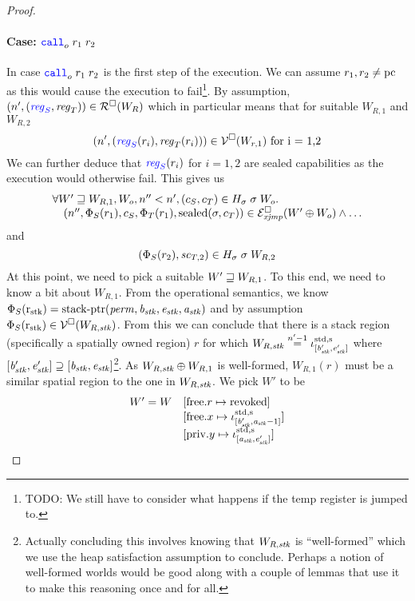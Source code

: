 \documentclass[a4paper]{article}
\begin{document}
\begin{proof}
\paragraph{Case: $\scall[o]{}{r_1}{r_2}$}
In case $\scall[o]{}{r_1}{r_2}$ is the first step of the execution. We can assume $r_1,r_2 \neq \pcreg$ as this would cause the execution to fail\footnote{{\color{red} TODO:} We still have to consider what happens if the temp register is jumped to.}. By assumption, $\npair[n']{\stpair{\reg}{\reg}} \in \lrr(W_R)$ which in particular means that for suitable $W_{R,1}$ and $W_{R,2}$
\[
  \npair[n']{(\src{\reg_S}(r_i),\reg_T(r_i))} \in \lrv(W_{r,1}) \text{ for i = 1,2}
\]
We can further deduce that $\src{\reg_S}(r_i)$ for $i=1,2$ are sealed capabilities as the execution would otherwise fail. This gives us
\[
  \begin{array}{l}
    \forall W' \future W_{R,1}, W_o, n'' < n', (c_S,c_T) \in H_\sigma \; \sigma \; W_o \ldotp \\
    \quad \npair[n'']{\Phi_S(r_1),c_S,\Phi_T(r_1),\sealed{\sigma,c_T}} \in \lrexj(W' \oplus W_o) \wedge \dots
  \end{array}
\]
and
\[
  (\Phi_S(r_2), \vsc_{T,2}) \in H_\sigma \; \sigma \; W_{R,2}
\]
At this point, we need to pick a suitable $W' \future W_{R,1}$. To this end, we need to know a bit about $W_{R,1}$. From the operational semantics, we know $\Phi_S(\rstk) = \stkptr{\perm,\baddr_\stk,\eaddr_\stk,\aaddr_\stk}$ and by assumption $\Phi_S(\rstk) \in \lrv(W_{R,\stk})$. From this we can conclude that there is a stack region (specifically a spatially owned region) $r$ for which $W_{R,\stk} \nequal[n'-1] \stdreg{[\baddr_\stk',\eaddr_\stk']}{\spa}$ where $[\baddr_\stk',\eaddr_\stk'] \supseteq [\baddr_\stk,\eaddr_\stk]$\footnote{Actually concluding this involves knowing that $W_{R,\stk}$ is ``well-formed'' which we use the heap satisfaction assumption to conclude. Perhaps a notion of well-formed worlds would be good along with a couple of lemmas that use it to make this reasoning once and for all.}. As $W_{R,\stk} \oplus W_{R,1}$ is well-formed, $W_{R,1}(r)$ must be a similar spatial region to the one in $W_{R,\stk}$.
We pick $W'$ to be
\[
  \begin{array}{r l}
    W' = W     & \update{\mathrm{free}.r}{\revoked}\\
               & \update{\mathrm{free}.x}{\stdreg{[\baddr_\stk',\aaddr_\stk -1]}{\spa}}\\
               & \update{\mathrm{priv}.y}{\stdreg{[\aaddr_\stk,\eaddr_\stk']}{\spa}}
  \end{array}
\]
\end{proof}
\end{document}
